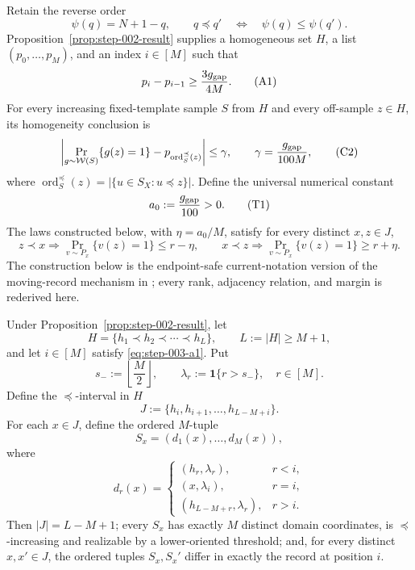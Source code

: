 Retain the reverse order
\[
\psi(q)=N+1-q,
\qquad
q\preceq q'\quad\Longleftrightarrow\quad \psi(q)\leq\psi(q').
\tag{C1}\label{eq:step-003-c1}
\]
Proposition~\ref{prop:step-002-result} supplies a
homogeneous set $H$, a list $(p_0,\ldots,p_M)$, and an index $i\in[M]$
such that
\[
p_i-p_{i-1}\geq\frac{3g_{\rm gap}}{4M}.
\tag{A1}\label{eq:step-003-a1}
\]
For every increasing fixed-template sample $S$ from $H$ and every
off-sample $z\in H$, its homogeneity conclusion is
\[
\left|\Pr_{g\sim\mathcal W(S)}\{g(z)=1\}
  -p_{\operatorname{ord}^{\preceq}_S(z)}\right|\leq\gamma,
\qquad
\gamma=\frac{g_{\rm gap}}{100M},
\tag{C2}\label{eq:step-003-c2}
\]
where
$\operatorname{ord}^{\preceq}_S(z)=
|\{u\in S_X:u\preceq z\}|$.
Define the universal numerical constant
\[
a_0:=\frac{g_{\rm gap}}{100}>0.
\tag{T1}\label{eq:step-003-t1}
\]
The laws constructed below, with $\eta=a_0/M$, satisfy for every
distinct $x,z\in J$,
\[
z\prec x\Longrightarrow
  \Pr_{v\sim P_x}\{v(z)=1\}\leq r-\eta,
\qquad
x\prec z\Longrightarrow
  \Pr_{v\sim P_x}\{v(z)=1\}\geq r+\eta.
\tag{T2}\label{eq:step-003-t2}
\]
The construction below is the endpoint-safe current-notation version of
the moving-record mechanism in \citet{alonEtAl2018private}; every rank,
adjacency relation, and margin is rederived here.



\begin{proposition}
\label{prop:step-003-fixed-extremes}

Under Proposition~\ref{prop:step-002-result}, let
\[
H=\{h_1\prec h_2\prec\cdots\prec h_L\},
\qquad L:=|H|\ge M+1,
\tag{1}\label{eq:step-003-1}
\]
and let \(i \in [M]\) satisfy \eqref{eq:step-003-a1}. Put
\[
s_-:=\left\lfloor\frac M2\right\rfloor,
\qquad
\lambda_r:=\mathbf 1\{r>s_-\},
\quad r\in[M].
\tag{2}\label{eq:step-003-2}
\]
Define the \(\preceq\)-interval in \(H\)
\[
J:=\{h_i,h_{i+1},\ldots,h_{L-M+i}\}.
\tag{3}\label{eq:step-003-3}
\]
For each \(x \in J\), define the ordered \(M\)-tuple
\[
S_x=(d_1(x),\ldots,d_M(x)),
\tag{4}\label{eq:step-003-4}
\]
where
\[
d_r(x)=
\begin{cases}
(h_r,\lambda_r),&r<i,\\
(x,\lambda_i),&r=i,\\
(h_{L-M+r},\lambda_r),&r>i.
\end{cases}
\tag{5}\label{eq:step-003-5}
\]
Then \(|J|=L-M+1\); every \(S_x\) has exactly \(M\) distinct domain coordinates, is \(\preceq\)-increasing and realizable by a lower-oriented threshold; and, for every distinct \(x,x' \in J\), the ordered tuples \(S_x,S_x'\) differ in exactly the record at position \(i\).

\end{proposition}

